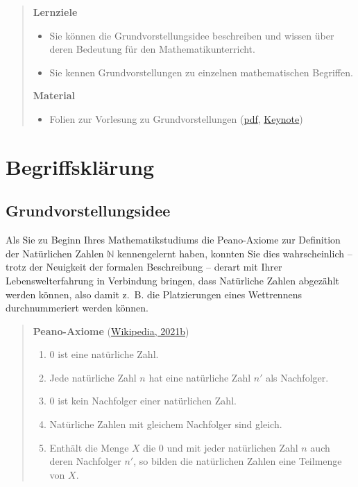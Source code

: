 \documentclass[
  ngerman,
]{scrbook}
\providecommand{\tightlist}{%
  \setlength{\itemsep}{0pt}\setlength{\parskip}{0pt}}
\theoremstyle{definition}
\theoremstyle{definition}
\theoremstyle{definition}
\theoremstyle{definition}
\theoremstyle{remark}
\begin{document}
\begin{quote}
\textbf{Lernziele}

\begin{itemize}
\tightlist
\item
  Sie können die Grundvorstellungsidee beschreiben und wissen über deren Bedeutung für den Mathematikunterricht.
\item
  Sie kennen Grundvorstellungen zu einzelnen mathematischen Begriffen.
\end{itemize}

\textbf{Material}

\begin{itemize}
\tightlist
\item
  Folien zur Vorlesung zu Grundvorstellungen (\href{files/Stoffdidaktik-WiSe2122-Kap4.pdf}{pdf}, \href{files/Stoffdidaktik-WiSe2122-Kap4.key}{Keynote})
\end{itemize}
\end{quote}

\hypertarget{grundvorstellungen-begriffsklaerung}{%
\section{Begriffsklärung}\label{grundvorstellungen-begriffsklaerung}}

\hypertarget{grundvorstellungsidee}{%
\subsection{Grundvorstellungsidee}\label{grundvorstellungsidee}}

Als Sie zu Beginn Ihres Mathematikstudiums die Peano-Axiome zur Definition der Natürlichen Zahlen \(\mathbb{N}\) kennengelernt haben, konnten Sie dies wahrscheinlich -- trotz der Neuigkeit der formalen Beschreibung -- derart mit Ihrer Lebenswelterfahrung in Verbindung bringen, dass Natürliche Zahlen abgezählt werden können, also damit z.~B. die Platzierungen eines Wettrennens durchnummeriert werden können.

\begin{quote}
\textbf{Peano-Axiome} (\protect\hyperlink{ref-WikiPeano}{Wikipedia, 2021b})

\begin{enumerate}
\def\labelenumi{\arabic{enumi}.}
\tightlist
\item
  \(0\) ist eine natürliche Zahl.
\item
  Jede natürliche Zahl \(n\) hat eine natürliche Zahl \(n'\) als Nachfolger.
\item
  \(0\) ist kein Nachfolger einer natürlichen Zahl.
\item
  Natürliche Zahlen mit gleichem Nachfolger sind gleich.
\item
  Enthält die Menge \(X\) die \(0\) und mit jeder natürlichen Zahl \(n\) auch deren Nachfolger \(n'\), so bilden die natürlichen Zahlen eine Teilmenge von \(X\).
\end{enumerate}
\end{quote}
\end{document}
